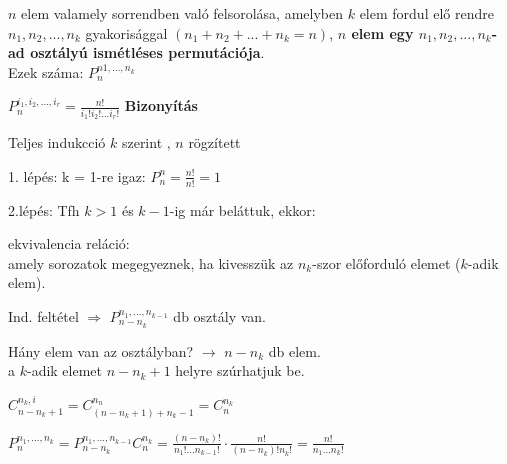 \begin{frame}
  \begin{tcolorbox}[title={Def.: Ismétléses Permutáció}]
      $n$ elem valamely sorrendben való felsorolása, amelyben $k$ elem fordul elő rendre $n_1, n_2, ..., n_k$ gyakorisággal $(n_1 + n_2 + ... + n_k = n)$, \textbf{$n$ elem egy $n_1, n_2, ..., n_k$-ad osztályú ismétléses permutációja}.\\
      Ezek száma: $P_n^{n1, ..., n_k}$
  \end{tcolorbox}

  \begin{tcolorbox}[title={Tétel: Ismétléses permutációk száma}]
    $P_n^{i_1, i_2, ..., i_r} = \frac{n!}{i_1!i_2!...i_r!}$
  \tcblower
    \textbf{Bizonyítás}\\
    \mmedskip

    Teljes indukcció $k$ szerint , $n$ rögzített\\
    \mmedskip

    1. lépés: k = 1-re igaz: $P_n^n = \frac{n!}{n!} = 1$\\
    \mbigskip

    2.lépés: Tfh $k > 1$ és $k - 1$-ig már beláttuk, ekkor:\\
    \msmallskip

    ekvivalencia reláció:\\
    amely sorozatok megegyeznek, ha kivesszük az $n_k$-szor előforduló elemet ($k$-adik elem).\\
    \msmallskip

    Ind. feltétel $\Rightarrow$ $P_{n - n_k}^{n_1, ..., n_{k - 1}}$ db osztály van.\\
    \msmallskip

    Hány elem van az osztályban? $\rightarrow$ $n - n_k$ db elem.\\
    a $k$-adik elemet $n - n_k + 1$ helyre szúrhatjuk be.\\
    \mmedskip

    $C_{n - n_k + 1}^{n_k, i} = C^{n_n}_{(n - n_k + 1) + n_k - 1} = C_n^{n_k}$\\
    \mmedskip

    $P_n^{n_1, ..., n_k} = P_{n - n_k}^{n_1, ..., n_{k - 1}} C_n^{n_k} = \frac{(n - n_k)!}{n_1!...n_{k - 1}!} \cdot \frac{n!}{(n - n_k)!n_k!} = \frac{n!}{n_1...n_k!}$
  \end{tcolorbox}
\end{frame}

